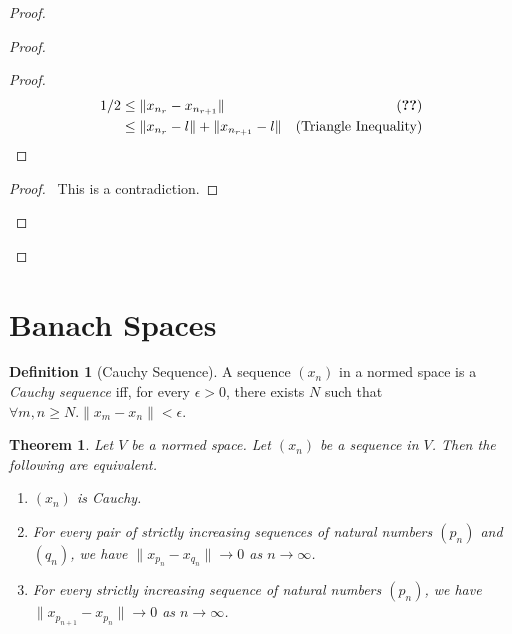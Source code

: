 \documentclass{book}
\let\qed\relax
\newtheorem{thm}[ax]{Theorem}
\theoremstyle{definition}
\newtheorem{df}[ax]{Definition}
\begin{document}
\begin{proof}
\begin{proof}
	\begin{proof}
		\pf
		\begin{align*}
			1/2 & \leq \| x_{n_r} - x_{n_{r+1}} \| & (\text{\stepref{b}}) \\
			& \leq \| x_{n_r} - l \| + \| x_{n_{r+1}} - l \| & (\text{Triangle Inequality})
		\end{align*}
	\end{proof}
	\qedstep
	\begin{proof}
		\pf\ This is a contradiction.
	\end{proof}
\end{proof}
\qed
\end{proof}

\section{Banach Spaces}

\begin{df}[Cauchy Sequence]
A sequence $(x_n)$ in a normed space is a \emph{Cauchy sequence} iff, for every $\epsilon > 0$, there exists $N$ such that $\forall m,n \geq N. \| x_m - x_n \| < \epsilon$.
\end{df}

\begin{thm}
Let $V$ be a normed space. Let $(x_n)$ be a sequence in $V$. Then the following are equivalent.
\begin{enumerate}
\item $(x_n)$ is Cauchy.
\item For every pair of strictly increasing sequences of natural numbers $(p_n)$ and $(q_n)$, we have $\| x_{p_n} - x_{q_n} \| \rightarrow 0$ as $n \rightarrow \infty$.
\item For every strictly increasing sequence of natural numbers $(p_n)$, we have $\| x_{p_{n+1}} - x_{p_n} \| \rightarrow 0$ as $n \rightarrow \infty$.
\end{enumerate}
\end{thm}
\end{document}
